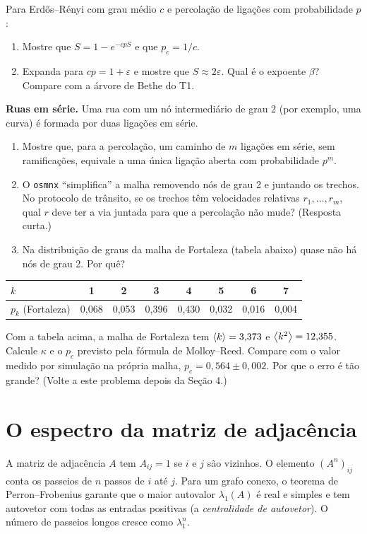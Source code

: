 \documentclass[11pt]{article}
\begin{document}
 Para Erdős--Rényi com grau médio $c$ e percolação de ligações com probabilidade $p$:
\begin{enumerate}
  \item Mostre que $S = 1-e^{-cpS}$ e que $p_c = 1/c$.
  \item Expanda para $cp = 1+\varepsilon$ e mostre que $S\approx 2\varepsilon$. Qual é o expoente $\beta$? Compare com a árvore de Bethe do T1.
\end{enumerate}

 \textbf{Ruas em série.} Uma rua com um nó intermediário de grau 2 (por exemplo, uma curva) é formada por duas ligações em série.
\begin{enumerate}
  \item Mostre que, para a percolação, um caminho de $m$ ligações em série, sem ramificações, equivale a uma única ligação aberta com probabilidade $p^m$.
  \item O \texttt{osmnx} ``simplifica'' a malha removendo nós de grau 2 e juntando os trechos. No protocolo de trânsito, se os trechos têm velocidades relativas $r_1,\dots,r_m$, qual $r$ deve ter a via juntada para que a percolação não mude? (Resposta curta.)
  \item Na distribuição de graus da malha de Fortaleza (tabela abaixo) quase não há nós de grau 2. Por quê?
\end{enumerate}

\begin{center}
\begin{tabular}{lccccccc}
\toprule
$k$ & 1 & 2 & 3 & 4 & 5 & 6 & 7\\
\midrule
$p_k$ (Fortaleza) & 0,068 & 0,053 & 0,396 & 0,430 & 0,032 & 0,016 & 0,004\\
\bottomrule
\end{tabular}
\end{center}

 Com a tabela acima, a malha de Fortaleza tem $\left\langle k \right\rangle = 3{,}373$ e $\left\langle k^2 \right\rangle = 12{,}355$. Calcule $\kappa$ e o $p_c$ previsto pela fórmula de Molloy--Reed. Compare com o valor medido por simulação na própria malha, $p_c = 0{,}564\pm0{,}002$. Por que o erro é tão grande? (Volte a este problema depois da Seção 4.)

\section{O espectro da matriz de adjacência}

A matriz de adjacência $A$ tem $A_{ij}=1$ se $i$ e $j$ são vizinhos. O elemento $(A^n)_{ij}$ conta os passeios de $n$ passos de $i$ até $j$. Para um grafo conexo, o teorema de Perron--Frobenius garante que o maior autovalor $\lambda_1(A)$ é real e simples e tem autovetor com todas as entradas positivas (a \emph{centralidade de autovetor}). O número de passeios longos cresce como $\lambda_1^n$.
\end{document}
